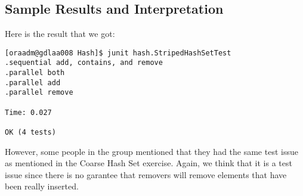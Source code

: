 \subsection{Sample Results and Interpretation}
\par
Here is the result that we got:
\hfill
\begin{verbatim}
[oraadm@gdlaa008 Hash]$ junit hash.StripedHashSetTest
.sequential add, contains, and remove
.parallel both
.parallel add
.parallel remove

Time: 0.027

OK (4 tests)
\end{verbatim}
\hfill
\par
However, some people in the group mentioned that they had the same test issue as
mentioned in the Coarse Hash Set exercise. Again, we think that it is a test
issue since there is no garantee that removers will remove elements that have
been really inserted.
\par

